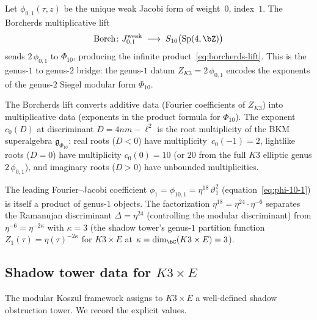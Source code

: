 \begin{theorem}
\label{thm:borcherds-lift-k3e}
Let $\phi_{0,1}(\tau,z)$ be the unique weak Jacobi form
of weight~$0$, index~$1$. The Borcherds multiplicative
lift
\[
\operatorname{Borch}\colon J_{0,1}^{\mathrm{weak}}
\;\longrightarrow\;
S_{10}\bigl(\operatorname{Sp}(4,\bZ)\bigr)
\]
sends $2\,\phi_{0,1}$ to $\Phi_{10}$, producing the
infinite product~\textup{\eqref{eq:borcherds-lift}}.
This is the genus-$1$ to genus-$2$ bridge: the
genus-$1$ datum $Z_{K3} = 2\,\phi_{0,1}$ encodes
the exponents of the genus-$2$ Siegel modular form
$\Phi_{10}$.
\end{theorem}

\begin{remark}
\label{rem:borcherds-lift-structure}
The Borcherds lift converts additive data (Fourier
coefficients of $Z_{K3}$) into multiplicative data
(exponents in the product formula for $\Phi_{10}$).
The exponent $c_0(D)$ at discriminant $D = 4nm - \ell^2$
is the root multiplicity of the BKM superalgebra
$\mathfrak{g}_{\Phi_{10}}$: real roots ($D < 0$) have
multiplicity~$c_0(-1) = 2$, lightlike roots ($D = 0$)
have multiplicity $c_0(0) = 10$ (or $20$ from the full
$K3$ elliptic genus $2\,\phi_{0,1}$), and imaginary roots
($D > 0$) have unbounded multiplicities.

The leading Fourier--Jacobi coefficient
$\phi_1 = \phi_{10,1} = \eta^{18}\,\vartheta_1^2$
(equation~\eqref{eq:phi-10-1}) is itself a product
of genus-$1$ objects. The factorization
$\eta^{18} = \eta^{24} \cdot \eta^{-6}$ separates
the Ramanujan discriminant $\Delta = \eta^{24}$
(controlling the modular discriminant) from
$\eta^{-6} = \eta^{-2\kappa}$ with $\kappa = 3$
(the shadow tower's genus-$1$ partition function
$Z_1(\tau) = \eta(\tau)^{-2\kappa}$ for
$K3 \times E$ at $\kappa = \dim_\bC(K3 \times E) = 3$).
\end{remark}

\subsection{Shadow tower data for \texorpdfstring{$K3 \times E$}{K3 x E}}
\label{subsec:shadow-tower-k3e}

The modular Koszul framework assigns to $K3 \times E$
a well-defined shadow obstruction tower. We record
the explicit values.

